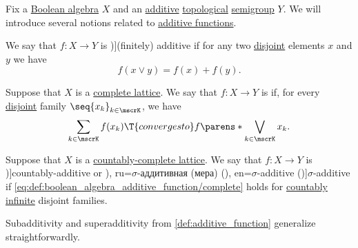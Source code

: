\begin{definition}\label{def:boolean_algebra_additive_function}\mimprovised
  Fix a \hyperref[def:boolean_algebra]{Boolean algebra} \( X \) and an \hyperref[def:additive_semigroup]{additive} \hyperref[def:topological_fol_structures]{topological} \hyperref[def:semigroup]{semigroup} \( Y \). We will introduce several notions related to \hyperref[def:additive_function]{additive functions}.

  \begin{thmenum}
     We say that \( f: X \to Y \) is \term[ru=(конечно) аддитивная (функция), en=finitely additive (\cite[289]{HalmosGivant2009BooleanAlgebras})]{(finitely) additive} if for any two \hyperref[def:disjoint_lattice_elements]{disjoint} elements \( x \) and \( y \) we have
    \begin{equation}\label{eq:def:boolean_algebra_additive_function/finite}
      f(x \vee y) = f(x) + f(y).
    \end{equation}

     Suppose that \( X \) is a \hyperref[def:complete_lattice]{complete lattice}. We say that \( f: X \to Y \) is  if, for every \hyperref[def:disjoint_lattice_elements]{disjoint} family \( \seq{ x_k }_{k \in \mscrK} \), we have
    \begin{equation}\label{eq:def:boolean_algebra_additive_function/complete}
      \sum_{k \in \mscrK} f(x_k) \T{converges to} f\parens*{ \bigvee_{k \in \mscrK} x_k }.
    \end{equation}

     Suppose that \( X \) is a \hyperref[def:countably_complete_lattice]{countably-complete lattice}. We say that \( f: X \to Y \) is \term[ru=счётно аддитивная (функция), en=countably additive (\cite[289]{HalmosGivant2009BooleanAlgebras})]{countably-additive} or \term[bg=\( \sigma \)-адитивно (изображение) (\cite[def. 3.7]{Драганов2022ТеорияНаМярката}), ru=\( \sigma \)-аддитивная (мера) (\cite[def. 2.1]{ДьяченкоУльянов1998МераИИнтеграл}), en=\( \sigma \)-additive (\cite[289]{HalmosGivant2009BooleanAlgebras})]{\( \sigma \)-additive} if \eqref{eq:def:boolean_algebra_additive_function/complete} holds for \hyperref[def:aleph_zero_related_cardinalities]{countably infinite} disjoint families.
  \end{thmenum}

  Subadditivity and superadditivity from \cref{def:additive_function} generalize straightforwardly.
\end{definition}
